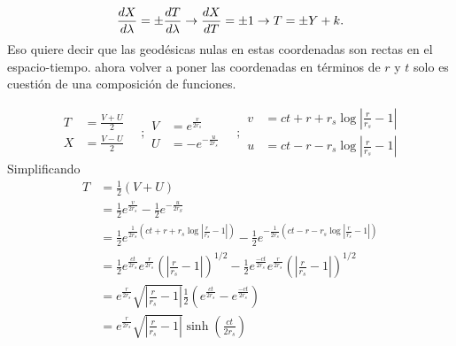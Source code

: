 \begin{equation}
    \frac{d X}{d \lambda} =\pm \frac{d T}{d \lambda} \to \frac{d X}{d T} = \pm 1 \to T = \pm Y + k.
\end{equation}
Eso quiere decir que las geodésicas nulas en estas coordenadas son rectas en el espacio-tiempo. 
ahora volver a poner las coordenadas en términos de $r$ y $t$ solo es cuestión de una composición de funciones.

\begin{equation}
    \begin{aligned}
        T&=\frac{V+U}{2} \\
        X&=\frac{V-U}{2}
    \end{aligned}
    \quad ; 
    \begin{aligned}
        V&=e^{\frac{v}{2 r_s}} \\
        U&=-e^{-\frac{u}{2 r_s}}
    \end{aligned}
    \quad ; 
    \begin{aligned}
        v&=c t+r+r_s \log \left|\frac{r}{r_s}-1\right| \\
        u&=c t-r-r_s \log \left|\frac{r}{r_s}-1\right|
    \end{aligned}
\end{equation}
Simplificando
\begin{equation}
    \begin{aligned}
        T & =  \frac{1}{2}\left(V + U\right)                                                                                                                                                      \\
          & = \frac{1}{2} e^{\frac{v}{2 r_s}}-\frac{1}{2} e^{-\frac{u}{2 r_S}}                                                                                                                    \\
          & = \frac{1}{2} e^{\frac{1}{2 r_s}\left(c t+r+r_s \log \left|\frac{r}{r_s}-1\right|\right)}-\frac{1}{2} e^{-\frac{1}{2 r_s}\left(c t-r-r_s \log \left|\frac{r}{r_s}-1\right|\right)}    \\
          & =\frac{1}{2} e^{\frac{c t}{2 r_s}} e^{\frac{r}{2 r_s}}\left(\left|\frac{r}{r_s}-1\right|\right)^{1 / 2}-\frac{1}{2} e^{\frac{-c t}{2 r_s}} e^{\frac{r}{2 r_s}}\left(\left|\frac{r}{r_s}-1\right|\right)^{1 / 2} \\
          & = e^{\frac{r}{2 r_s}} \sqrt{\left|\frac{r}{r_s}-1\right|} \frac{1}{2}\left(e^{\frac{c t}{2 r_s}}-e^{\frac{-c t}{2 r_s}}\right)                                                                     \\
          & = e^{\frac{r}{2 r_s}} \sqrt{\left|\frac{r}{r_s}-1\right|} \sinh\left(\frac{ct}{2r_s}\right)
          \label{eq:Kruskal-SzekeresT(r,t)}
    \end{aligned}
\end{equation}
